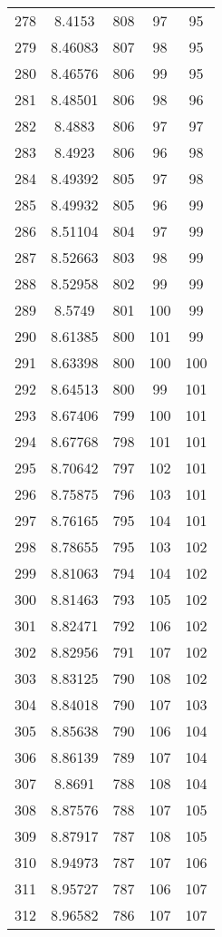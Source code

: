 \documentclass[12pt,a4paper]{article}
\begin{document}
\begin{tabular}{r|cccc}
	278 & 8.4153 & 808 & 97 & 95 \\
	279 & 8.46083 & 807 & 98 & 95 \\
	280 & 8.46576 & 806 & 99 & 95 \\
	281 & 8.48501 & 806 & 98 & 96 \\
	282 & 8.4883 & 806 & 97 & 97 \\
	283 & 8.4923 & 806 & 96 & 98 \\
	284 & 8.49392 & 805 & 97 & 98 \\
	285 & 8.49932 & 805 & 96 & 99 \\
	286 & 8.51104 & 804 & 97 & 99 \\
	287 & 8.52663 & 803 & 98 & 99 \\
	288 & 8.52958 & 802 & 99 & 99 \\
	289 & 8.5749 & 801 & 100 & 99 \\
	290 & 8.61385 & 800 & 101 & 99 \\
	291 & 8.63398 & 800 & 100 & 100 \\
	292 & 8.64513 & 800 & 99 & 101 \\
	293 & 8.67406 & 799 & 100 & 101 \\
	294 & 8.67768 & 798 & 101 & 101 \\
	295 & 8.70642 & 797 & 102 & 101 \\
	296 & 8.75875 & 796 & 103 & 101 \\
	297 & 8.76165 & 795 & 104 & 101 \\
	298 & 8.78655 & 795 & 103 & 102 \\
	299 & 8.81063 & 794 & 104 & 102 \\
	300 & 8.81463 & 793 & 105 & 102 \\
	301 & 8.82471 & 792 & 106 & 102 \\
	302 & 8.82956 & 791 & 107 & 102 \\
	303 & 8.83125 & 790 & 108 & 102 \\
	304 & 8.84018 & 790 & 107 & 103 \\
	305 & 8.85638 & 790 & 106 & 104 \\
	306 & 8.86139 & 789 & 107 & 104 \\
	307 & 8.8691 & 788 & 108 & 104 \\
	308 & 8.87576 & 788 & 107 & 105 \\
	309 & 8.87917 & 787 & 108 & 105 \\
	310 & 8.94973 & 787 & 107 & 106 \\
	311 & 8.95727 & 787 & 106 & 107 \\
	312 & 8.96582 & 786 & 107 & 107 \\

\end{tabular}
\end{document}
